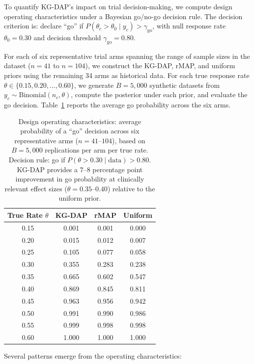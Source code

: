 \documentclass[12pt]{article}
\newcommand{\thetac}{\theta_c}
\begin{document}
To quantify KG-DAP's impact on trial decision-making, we compute design operating characteristics under a Bayesian go/no-go decision rule. The decision criterion is: declare ``go'' if $P(\thetac > \theta_0 \mid y_c) > \gamma_{\mathrm{go}}$, with null response rate $\theta_0 = 0.30$ and decision threshold $\gamma_{\mathrm{go}} = 0.80$.

For each of six representative trial arms spanning the range of sample sizes in the dataset ($n = 41$ to $n = 104$), we construct the KG-DAP, rMAP, and uniform priors using the remaining 34 arms as historical data. For each true response rate $\theta \in \{0.15, 0.20, \ldots, 0.60\}$, we generate $B = 5{,}000$ synthetic datasets from $y_c \sim \mathrm{Binomial}(n_c, \theta)$, compute the posterior under each prior, and evaluate the go decision. Table~\ref{tab:design_oc} reports the average go probability across the six arms.

\begin{table}[t]
\centering
\caption{Design operating characteristics: average probability of a ``go'' decision across six representative arms ($n = 41$--$104$), based on $B = 5{,}000$ replications per arm per true rate. Decision rule: go if $P(\theta > 0.30 \mid \text{data}) > 0.80$. KG-DAP provides a 7--8 percentage point improvement in go probability at clinically relevant effect sizes ($\theta = 0.35$--$0.40$) relative to the uniform prior.}
\label{tab:design_oc}
\begin{tabular}{cccc}
\toprule
True Rate $\theta$ & KG-DAP & rMAP & Uniform \\
\midrule
0.15 & 0.001 & 0.001 & 0.000 \\
0.20 & 0.015 & 0.012 & 0.007 \\
0.25 & 0.105 & 0.077 & 0.058 \\
0.30 & 0.355 & 0.283 & 0.238 \\
0.35 & 0.665 & 0.602 & 0.547 \\
0.40 & 0.869 & 0.845 & 0.811 \\
0.45 & 0.963 & 0.956 & 0.942 \\
0.50 & 0.991 & 0.990 & 0.986 \\
0.55 & 0.999 & 0.998 & 0.998 \\
0.60 & 1.000 & 1.000 & 1.000 \\
\bottomrule
\end{tabular}
\end{table}

Several patterns emerge from the operating characteristics:
\end{document}
